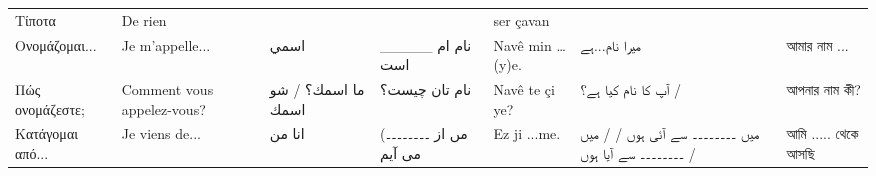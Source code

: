 \begin{longtable}{p{3.5cm} p{3.5cm} p{3.5cm} p{3.5cm} p{3.5cm} p{3.5cm} p{3.5cm} }
 Τίποτα                                                                                                                        & De rien                                                                                         &                                                                                       &                                                             & ser çavan                                                                          &                                                                                &                                                                   \\
 Ονομάζομαι...                                                                                                                 & Je m'appelle...                                                                                 & اسمي                                                                                  & نام ام \_\_\_\_\_ است                                            & Navê min …(y)e.                                                                    & میرا نام...ہے                                                                  & আমার নাম ...                                                      \\
 Πώς ονομάζεστε;                                                                                                               & Comment vous appelez-vous?                                                                      & ما اسمك؟          / شو اسمك                                                           & نام تان چیست؟                                               & Navê te çi ye?                                                                     & آپ کا نام کیا ہے؟ /                                                           & আপনার নাম কী?                                                     \\
 Κατάγομαι από...                                                                                                              & Je viens de...                                                                                  & انا من                                                                                & (مں از ۔۔۔۔۔۔۔۔ می آیم                                     & Ez ji ...me.                                                                       & میں ۔۔۔۔۔۔۔۔ سے آئی ہوں  /  / میں ۔۔۔۔۔۔۔۔ سے آیا ہوں /                      & আমি ..... থেকে আসছি                                               \\

\end{longtable}
